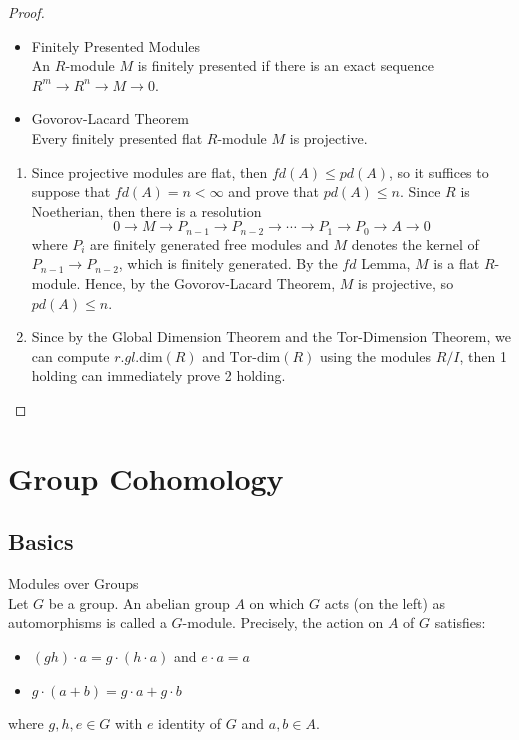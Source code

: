 \begin{proof}
    \begin{itemize}
        \item \begin{definition}{Finitely Presented Modules}\\
        An $R$-module $M$ is finitely presented if there is an exact sequence $R^m\to R^n\to M\to0$.
        \end{definition}
        \item \begin{lemma}{Govorov-Lacard Theorem}\\
        Every finitely presented flat $R$-module $M$ is projective.
        \end{lemma}
    \end{itemize}
    \begin{enumerate}
        \item Since projective modules are flat, then $fd(A) \leq pd(A)$, so it suffices to suppose that $fd(A)=n <\infty$ and prove that $pd(A)\leq n$. Since $R$ is Noetherian, then there is a resolution
        \[
        0\to M\to P_{n-1} \to P_{n-2} \to \cdots\to P_1\to P_0\to A\to0
        \]
        where $P_i$ are finitely generated free modules and $M$ denotes the kernel of $P_{n-1} \to P_{n-2}$, which is finitely generated. By the $fd$ Lemma, $M$ is a flat $R$-module. Hence, by the Govorov-Lacard Theorem, $M$ is projective, so $pd(A)\leq n$.

        \item Since by the Global Dimension Theorem and the Tor-Dimension Theorem, we can compute $r.gl.\text{dim} (R)$ and $\text{Tor}$-$\text{dim} (R)$ using the modules $R/I$, then 1 holding can immediately prove 2 holding.
    \end{enumerate}
\end{proof}


\section{Group Cohomology}

\subsection{Basics}

\begin{definition}{Modules over Groups}\\
Let $G$ be a group. An abelian group $A$ on which $G$ acts (on the left) as automorphisms is called a $G$-module. Precisely, the action on $A$ of $G$ satisfies: 
\begin{itemize}
    \item $(gh) \cdot a=g\cdot (h\cdot a)$ and $e\cdot a=a$
    \item $g \cdot (a+b)=g \cdot a+g\cdot b$
\end{itemize}
where $g,h, e\in G$ with $e$ identity of $G$ and $a,b \in A$.
\end{definition}

